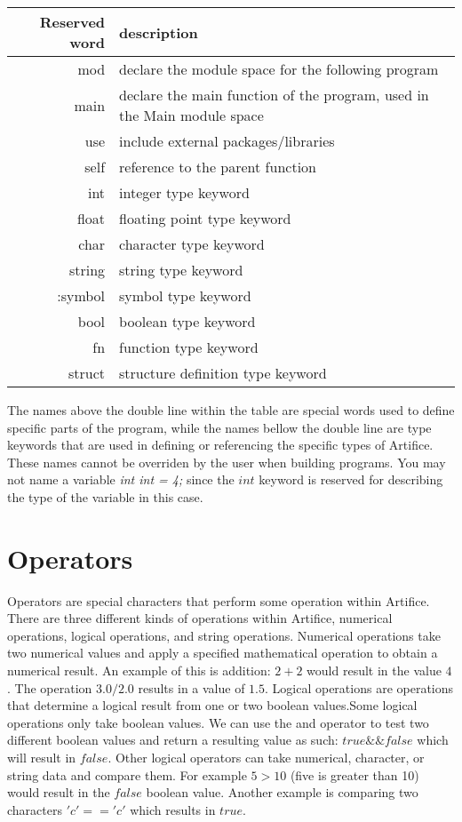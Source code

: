 \documentclass{article}
\begin{document}
\begin{center}
\begin{tabular}{|r|l|}
\hline
Reserved word & description \\
\hline
\hline
mod & declare the module space for the following program \\
main & declare the main function of the program, used in the Main module space \\
use & include external packages/libraries \\
self & reference to the parent function \\
\hline
\hline
int & integer type keyword \\
float & floating point type keyword \\
char & character type keyword \\
string & string type keyword \\
:symbol & symbol type keyword \\
bool & boolean type keyword \\
fn & function type keyword \\
struct & structure definition type keyword \\
\hline
\end{tabular}
\end{center}

The names above the double line within the table are special words used to define specific parts of the program, while the names bellow the double line are type keywords that
are used in defining or referencing the specific types of Artifice. These names cannot be overriden by the user when building programs. You may not name a variable
\textit{int int = 4;} since the $int$ keyword is reserved for describing the type of the variable in this case.

\section{Operators}

Operators are special characters that perform some operation within Artifice. There are three different kinds of operations within Artifice, numerical operations, logical operations,
and string operations. Numerical operations take two numerical values and apply a specified mathematical operation to obtain a numerical result. An example of this is addition:
$2 + 2$ would result in the value $4$. The operation $3.0 / 2.0$ results in a value of $1.5$. Logical operations are operations that determine a logical result from one or two
boolean values.Some logical operations only take boolean values. We can use the and operator to test two different boolean values and return a resulting value as such: $true \&\& false$
which will result in $false$. Other logical operators can take numerical, character, or string data and compare them. For example $5 > 10$ (five is greater than 10) would result in
the $false$ boolean value. Another example is comparing two characters $'c' == 'c'$ which results in $true$.
\end{document}
